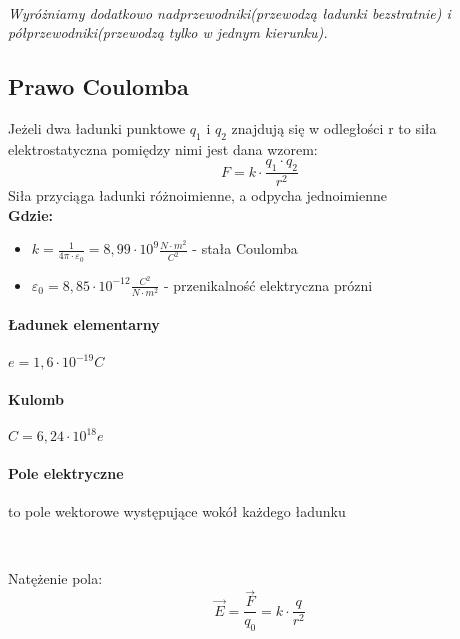 \documentclass{article}
\begin{document}
        \
        
        \textit{Wyróżniamy dodatkowo nadprzewodniki(przewodzą
        ładunki bezstratnie) i półprzewodniki(przewodzą
        tylko w jednym kierunku).}

        \subsection{Prawo Coulomba}
            Jeżeli dwa ładunki punktowe $q_1$ i $q_2$ znajdują się
            w odległości r to siła elektrostatyczna pomiędzy nimi jest
            dana wzorem:
            \begin{equation}
                F = k \cdotp \frac{q_1 \cdotp q_2}{r^2}
            \end{equation} 
            Siła przyciąga ładunki różnoimienne, a odpycha jednoimienne
        \\
        \textbf{Gdzie:}
        \begin{itemize}
            \item $k = \frac{1}{4 \pi \cdotp \varepsilon_0} = 
            8,99 \cdotp 10^9 \frac{N \cdotp m^2}{C^2}$
            - stała Coulomba
        
            \item $\varepsilon_0 = 8,85 \cdotp 10^{-12} \frac{C^2}{N \cdotp m^2}$
            - przenikalność elektryczna prózni
        \end{itemize}
        
        \paragraph{Ładunek elementarny }
        $e = 1,6 \cdotp 10^{-19} C$
        \paragraph{Kulomb} 
        $C = 6,24 \cdotp 10^{18} e$

        \paragraph{Pole elektryczne }
        to pole wektorowe występujące wokół każdego ładunku

        \
        
        Natężenie pola: 
        \begin{equation}
            \vec{E} = \frac{\vec{F}}{q_0} = k \cdotp \frac{q}{r^2}    
        \end{equation}
        
\end{document}
